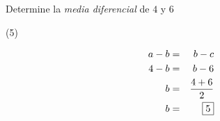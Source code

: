 \item{Determine la \textit{media diferencial} de $4$ y $6$
	\begin{tasks}(5)
	\end{tasks}
	\begin{eqnarray*}
		a - b &=& b - c \\
		4 - b &=& b - 6 \\
		b &=& \dfrac{4 + 6}{2} \\
		b &=& \fbox{5}
	\end{eqnarray*}
}
